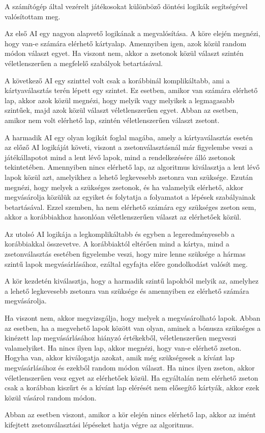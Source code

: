 
A számítógép által vezérelt játékosokat különböző döntési logikák segítségével valósítottam meg.

Az első AI egy nagyon alapvető logikának a megvalósítása. A köre elején megnézi, hogy van-e számára elérhető kártyalap. Amennyiben igen, azok közül random módon választ egyet. Ha viszont nem, akkor a zsetonok közül választ szintén véletlenszerűen a megfelelő szabályok betartásával.

A következő AI egy szinttel volt csak a korábbinál komplikáltabb, ami a kártyaválasztás terén lépett egy szintet. Ez esetben, amikor van számára elérhető lap, akkor azok közül megnézi, hogy melyik vagy melyikek a legmagasabb szintűek, majd azok közül választ véletlenszerűen egyet. Abban az esetben, amikor nem volt elérhető lap, szintén véletlenszerűen választ zsetont.

A harmadik AI egy olyan logikát foglal magába, amely a kártyaválasztás esetén az előző AI logikáját követi, viszont a zsetonválasztásnál már figyelembe veszi a játékállapotot mind a lent lévő lapok, mind a rendelkezésére álló zsetonok tekintetében. Amennyiben nincs elérhető lap, az algoritmus kiválasztja a lent lévő lapok közül azt, amelyikhez a lehető legkevesebb zsetonra van szüksége. Ezután megnézi, hogy melyek a szükséges zsetonok, és ha valamelyik elérhető, akkor megvásárolja közülük az egyiket és folytatja a folyamatot a lépések szabályainak betartásával. Ezzel szemben, ha nem elérhető számára egy szükséges zseton sem, akkor a korábbiakhoz hasonlóan véletlenszerűen választ az elérhetőek közül.

Az utolsó AI logikája a legkomplikáltabb és egyben a legeredményesebb a korábbiakkal összevetve. A korábbiaktól eltérően mind a kártya, mind a zsetonválasztás esetében figyelembe veszi, hogy mire lenne szüksége a hármas szintű lapok megvásárlásához, ezáltal egyfajta előre gondolkodást valósít meg.\par
A kör kezdetén kiválasztja, hogy a harmadik szintű lapokból melyik az, amelyhez a lehető legkevesebb zsetonra van szüksége és amennyiben ez elérhető számára megvásárolja.\par
Ha viszont nem, akkor megvizsgálja, hogy melyek a megvásárolható lapok. Abban az esetben, ha a megvehető lapok között van olyan, aminek a bónusza szükséges a kinézett lap megvásárlásához hiányzó értékekből, véletlenszerűen megveszi valamelyiket. Ha nincs ilyen lap, akkor megnézi, hogy van-e elérhető zseton. Hogyha van, akkor kiválogatja azokat, amik még szükségesek a kívánt lap megvásárlásához és ezekből random módon választ. Ha nincs ilyen zseton, akkor véletlenszerűen vesz egyet az elérhetőek közül. Ha egyáltalán nem elérhető zseton csak a korábban kiszűrt és a kívánt lap elérését nem elősegítő kártyák, akkor ezek közül vásárol random módon.\par
Abban az esetben viszont, amikor a kör elején nincs elérhető lap, akkor az imént kifejtett zsetonválasztási lépéseket hatja végre az algoritmus.